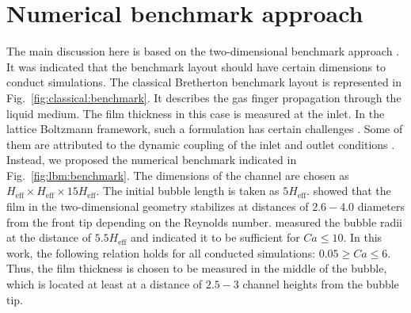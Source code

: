 \documentclass[preprint,12pt]{elsarticle}
\begin{document}
\section{Numerical benchmark approach}
\label{sec:numerical:benchmark}
The main discussion here is based on the two-dimensional benchmark approach
\cite{kuzmin-binary2d}. It was indicated that the benchmark layout should have certain
dimensions to conduct simulations. The classical Bretherton benchmark layout is represented in
Fig.~\ref{fig:classical:benchmark}. It describes the gas finger propagation through the liquid
medium.
The film thickness in this case is measured at the inlet. In the lattice Boltzmann framework, such a
formulation has certain challenges \cite{kuzmin-binary2d}. Some of them are attributed to the
dynamic coupling of the inlet and outlet conditions \cite{giavedoni-numerical}. Instead, we
proposed the numerical benchmark indicated in Fig.~\ref{fig:lbm:benchmark}. The dimensions of the
channel are chosen as $H_{\mathrm{eff}}\times H_{\mathrm{eff}} \times 15 H_{\mathrm{eff}}$. The
initial bubble length is taken as $5 H_{\mathrm{eff}}$. \citet{giavedoni-numerical} showed that
the film in the two-dimensional geometry stabilizes at distances of $2.6-4.0$ diameters
from the front tip depending on the Reynolds number. \citet{heil-threedim} measured the bubble radii
at the distance of $5.5 H_{\mathrm{eff}}$ and indicated it to be sufficient for $Ca\leq 10$. In
this work, the following relation holds for all conducted simulations: $0.05 \geq Ca \leq 6$.
Thus, the
film thickness is chosen to be measured in the
middle of the bubble, which is located at least at a distance of $2.5-3$ channel heights from the 
bubble tip.%
\end{document}
